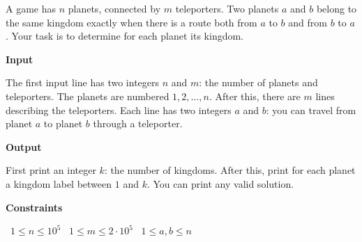 A game has $n$ planets, connected by $m$ teleporters. Two planets $a$ and $b$ belong to the same kingdom exactly when there is a route both from $a$ to $b$ and from $b$ to $a$. Your task is to determine for each planet its kingdom.

\vspace{0.3cm}\noindent\textbf{Input}

The first input line has two integers $n$ and $m$: the number of planets and teleporters. The planets are numbered $1,2,\dots,n$.
After this, there are $m$ lines describing the teleporters. Each line has two integers $a$ and $b$: you can travel from planet $a$ to planet $b$ through a teleporter.

\vspace{0.3cm}\noindent\textbf{Output}

First print an integer $k$: the number of kingdoms. After this, print for each planet a kingdom label between $1$ and $k$. You can print any valid solution.

\vspace{0.3cm}\noindent\textbf{Constraints}

\textbullet\ $1 \le n \le 10^5$
\textbullet\ $1 \le m \le 2 \cdot 10^5$
\textbullet\ $1 \le a,b \le n$